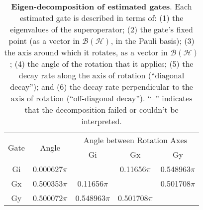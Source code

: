 {\begin{table}[h]
\begin{center}
\vspace{2em}
\begin{tabular}[l]{|c|c|c|c|c|}
\hline
\multirow{2}{*}{Gate} & \multirow{2}{*}{Angle} & \multicolumn{3}{c|}{Angle between Rotation Axes} \\ \cline{3-5}
 & & Gi & Gx & Gy \\ \hline
Gi & 0.000627$\pi$ &  & 0.11656$\pi$ & 0.548963$\pi$ \\ \hline
Gx & 0.500353$\pi$ & 0.11656$\pi$ &  & 0.501708$\pi$ \\ \hline
Gy & 0.500072$\pi$ & 0.548963$\pi$ & 0.501708$\pi$ &  \\ \hline
\end{tabular}

\caption{\textbf{Eigen-decomposition of estimated gates}.  Each estimated gate is described in terms of: (1) the eigenvalues of the superoperator; (2) the gate's fixed point (as a vector in $\mathcal{B}(\mathcal{H})$, in the Pauli basis); (3)  the axis around which it rotates, as a vector in $\mathcal{B}(\mathcal{H})$; (4) the angle of the rotation that it applies; (5) the decay rate along the axis of rotation (``diagonal decay''); and (6) the decay rate perpendicular to the axis of rotation (``off-diagonal decay'').  ``--'' indicates that the decomposition failed or couldn't be interpreted. \label{bestCPTPGatesetDecompTable}}
\end{center}
\end{table}


}
